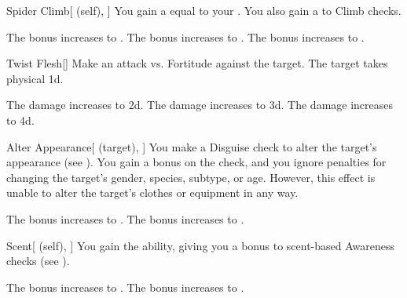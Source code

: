\lowercase{\hypertarget{spell:Spider Climb}{}}\label{spell:Spider Climb}
\begin{attuneability}[Rank 1]{\hypertarget{spell:Spider Climb}{Spider Climb}}[ (self), ]
You gain a  equal to your .
You also gain a   to Climb checks.

\rankline
{} The bonus increases to .
 The bonus increases to .
 The bonus increases to .
\end{attuneability}
\vspace{0.25em}



\lowercase{\hypertarget{spell:Twist Flesh}{}}\label{spell:Twist Flesh}
\begin{freeability}[Rank 1]{\hypertarget{spell:Twist Flesh}{Twist Flesh}}[]
Make an attack vs. Fortitude against the target.
\hit The target takes physical  \plus1d.

\rankline
{} The damage increases to  \plus2d.
 The damage increases to  \plus3d.
 The damage increases to  \plus4d.
\end{freeability}
\vspace{0.25em}



\lowercase{\hypertarget{spell:Alter Appearance}{}}\label{spell:Alter Appearance}
\begin{attuneability}[Rank 3]{\hypertarget{spell:Alter Appearance}{Alter Appearance}}[ (target), ]
You make a Disguise check to alter the target's appearance (see ).
You gain a  bonus on the check, and you ignore penalties for changing the target's gender, species, subtype, or age.
However, this effect is unable to alter the target's clothes or equipment in any way.

\rankline
{} The bonus increases to .
 The bonus increases to .
\end{attuneability}
\vspace{0.25em}



\lowercase{\hypertarget{spell:Scent}{}}\label{spell:Scent}
\begin{attuneability}[Rank 3]{\hypertarget{spell:Scent}{Scent}}[ (self), ]
You gain the  ability, giving you a  bonus to scent-based Awareness checks (see ).

\rankline
{} The bonus increases to .
 The bonus increases to .
\end{attuneability}
\vspace{0.25em}



